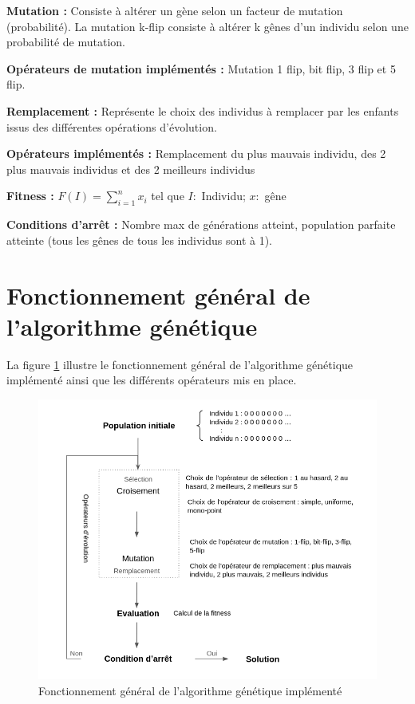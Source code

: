 \documentclass[12pt]{article}
\begin{document}
\begin{description}
\begin{itemize}[label=-]
\end{itemize} 

\item{\textbf{Mutation :}} Consiste à altérer un gène selon un facteur de mutation (probabilité). La mutation k-flip consiste à altérer k gênes d'un individu selon une probabilité de mutation.
\item{\textbf{Opérateurs de mutation implémentés :} } Mutation 1 flip, bit flip, 3 flip et 5 flip.

\item{\textbf{Remplacement :}} Représente le choix des individus à remplacer par les enfants issus des différentes opérations d'évolution.
\item{\textbf{Opérateurs implémentés :}} Remplacement du plus mauvais individu, des 2 plus mauvais individus et des 2 meilleurs individus

\item{\textbf{Fitness :}} $ F(I) = \sum_{i=1}^{n} x_i $   tel que $ I : $ Individu; $ x : $ gêne

\item{\textbf{Conditions d'arrêt :}} Nombre max de générations atteint, population parfaite atteinte (tous les gênes de tous les individus sont à 1).

\end{description}


\section{Fonctionnement général de l'algorithme génétique}
La figure \ref{fonct_algo} illustre le fonctionnement général de l'algorithme génétique implémenté ainsi que les différents opérateurs mis en place.

\begin{figure}[H]
		\begin{center}
			\includegraphics[scale=0.7]{img/fonct-algo.png}
			\caption{Fonctionnement général de l'algorithme génétique implémenté}
			\label{fonct_algo}
		\end{center}
\end{figure}
\end{document}
